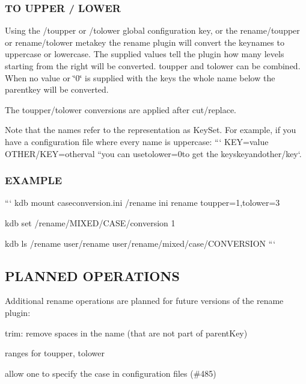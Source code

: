 \subsubsection*{T\+O U\+P\+P\+E\+R / L\+O\+W\+E\+R}

Using the {\ttfamily /toupper} or {\ttfamily /tolower} global configuration key, or the {\ttfamily rename/toupper} or {\ttfamily rename/tolower} metakey the rename plugin will convert the keynames to uppercase or lowercase. The supplied values tell the plugin how many levels starting from the right will be converted. {\ttfamily toupper} and {\ttfamily tolower} can be combined. When no value or \char`\"{}0\char`\"{} is supplied with the keys the whole name below the parentkey will be converted.

The toupper/tolower conversions are applied after cut/replace.

Note that the names refer to the representation as Key\+Set. For example, if you have a configuration file where every name is uppercase\+: ``` K\+E\+Y=value O\+T\+H\+E\+R/\+K\+E\+Y=otherval ``{\ttfamily  you can use}tolower=0{\ttfamily to get the keys}key{\ttfamily and}other/key`.

\subsubsection*{E\+X\+A\+M\+P\+L\+E}

``` kdb mount caseconversion.\+ini /rename ini rename toupper=1,tolower=3

kdb set /rename/\+M\+I\+X\+E\+D/\+C\+A\+S\+E/conversion 1

kdb ls /rename user/rename user/rename/mixed/case/\+C\+O\+N\+V\+E\+R\+S\+I\+O\+N ```

\subsection*{P\+L\+A\+N\+N\+E\+D O\+P\+E\+R\+A\+T\+I\+O\+N\+S}

Additional rename operations are planned for future versions of the rename plugin\+:
\begin{DoxyItemize}
\item trim\+: remove spaces in the name (that are not part of parent\+Key)
\item ranges for toupper, tolower
\item allow one to specify the case in configuration files (\#485) 
\end{DoxyItemize}